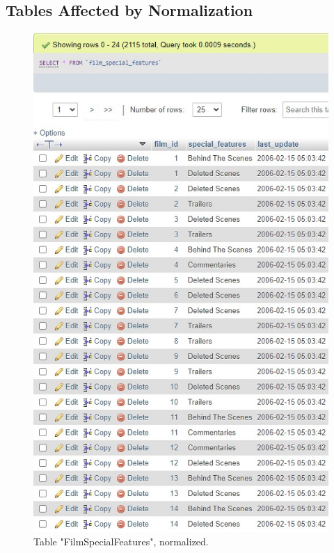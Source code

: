 \documentclass{article}
\begin{document}
	\subsection{Tables Affected by Normalization}
		\begin{figure}[H]
			\includegraphics[width=\textwidth]{table_filmspecialfeatures_norm}
			\caption{Table "Film\textunderscore Special\textunderscore Features", normalized.}
		\end{figure}
\end{document}
